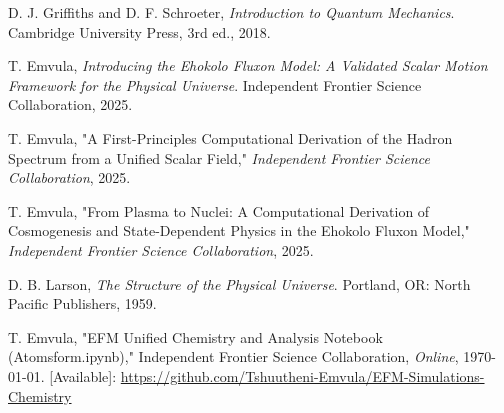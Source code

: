 \documentclass[11pt]{article}
\begin{document}

\begin{thebibliography}{99}
\raggedright

D. J. Griffiths and D. F. Schroeter, \textit{Introduction to Quantum Mechanics}. Cambridge University Press, 3rd ed., 2018.

T. Emvula, \textit{Introducing the Ehokolo Fluxon Model: A Validated Scalar Motion Framework for the Physical Universe}. Independent Frontier Science Collaboration, 2025.

T. Emvula, "A First-Principles Computational Derivation of the Hadron Spectrum from a Unified Scalar Field," \textit{Independent Frontier Science Collaboration}, 2025.

T. Emvula, "From Plasma to Nuclei: A Computational Derivation of Cosmogenesis and State-Dependent Physics in the Ehokolo Fluxon Model," \textit{Independent Frontier Science Collaboration}, 2025.

D. B. Larson, \textit{The Structure of the Physical Universe}. Portland, OR: North Pacific Publishers, 1959.

T. Emvula, "EFM Unified Chemistry and Analysis Notebook (Atomsform.ipynb)," Independent Frontier Science Collaboration, \textit{Online}, \today. [Available]: \url{https://github.com/Tshuutheni-Emvula/EFM-Simulations-Chemistry}

\end{thebibliography}
\end{document}
